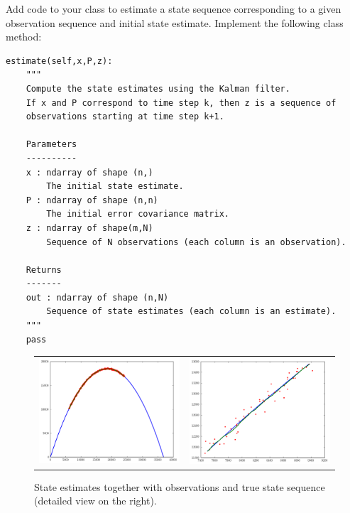 \begin{problem}
Add code to your  class to estimate a state sequence corresponding to a given observation sequence and initial state estimate.
Implement the following class method:
\begin{lstlisting}
estimate(self,x,P,z):
    """
    Compute the state estimates using the Kalman filter.
    If x and P correspond to time step k, then z is a sequence of 
    observations starting at time step k+1.
    
    Parameters
    ----------
    x : ndarray of shape (n,)
        The initial state estimate.
    P : ndarray of shape (n,n)
        The initial error covariance matrix.
    z : ndarray of shape(m,N)
        Sequence of N observations (each column is an observation).

    Returns
    -------
    out : ndarray of shape (n,N)
        Sequence of state estimates (each column is an estimate).
    """
    pass
\end{lstlisting}
\end{problem}

\begin{figure}
	\centering
	\begin{tabular}{cc}
	\includegraphics[width=.45\textwidth]{estimate_macro} &
	\includegraphics[width=.45\textwidth]{estimate_micro}
	\end{tabular}
	\caption{State estimates together with observations and true state sequence (detailed view on the right).}
	\label{fig:estimates}
\end{figure}

